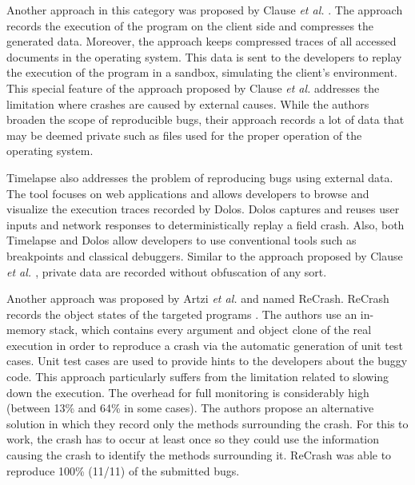Another approach in this category was  proposed by Clause {\it et al.} \cite{Clause2007}.
The approach records the execution of the program on the client side and compresses the generated data.
Moreover, the approach keeps compressed traces of all accessed documents in the operating system.
This data is sent to the developers to replay the execution of the program in a sandbox, simulating the client's environment.
This special feature of the approach proposed by Clause {\it et al.} addresses the limitation where crashes are caused by external causes.
While the authors broaden the scope of reproducible bugs, their approach records a lot of data that may be deemed private such as files used for the proper operation of the operating system.

Timelapse \cite{Burg2013} also addresses the problem of reproducing bugs using external data.
The tool focuses on web applications and allows developers to browse and visualize the execution traces recorded by Dolos. Dolos captures and reuses user inputs and network responses to deterministically replay a field crash.
Also, both Timelapse and Dolos allow developers to use conventional tools such as breakpoints and classical debuggers. Similar to the approach proposed by Clause {\it et al. \cite{Clause2007}}, private data are recorded without obfuscation of any sort.

Another approach was proposed by Artzi {\it et al.} and named ReCrash.
ReCrash records the object states of the targeted programs \cite{Artzi2008}.
The authors use an in-memory stack, which contains every argument and object clone of the real execution in order to reproduce a crash via the automatic generation of unit test cases.
Unit test cases are used to provide hints to the developers about the buggy code.
This approach particularly suffers from the limitation related to slowing down the execution.
The overhead for full monitoring is considerably high (between 13\% and 64\% in some cases).
The authors  propose an alternative solution in which they record only the methods surrounding the crash.
For this to work, the crash has to occur at least once so they could use the information causing the crash to identify the methods surrounding it.
ReCrash was able to reproduce 100\% (11/11) of the submitted bugs.

